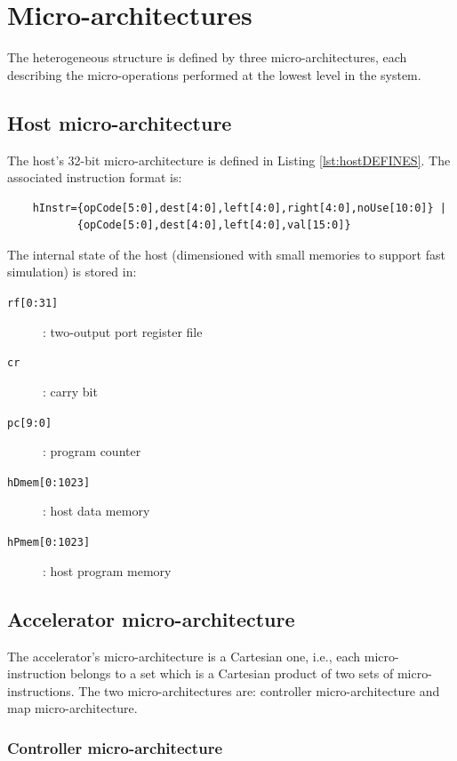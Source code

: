\section{Micro-architectures}

The heterogeneous structure is defined by three micro-architectures, each describing the micro-operations performed at the lowest level in the system.

\subsection{Host micro-architecture}

The host's 32-bit micro-architecture is defined in Listing \ref{lst:hostDEFINES}. The associated instruction format is: 
\begin{verbatim}
    hInstr={opCode[5:0],dest[4:0],left[4:0],right[4:0],noUse[10:0]} | 
           {opCode[5:0],dest[4:0],left[4:0],val[15:0]}
\end{verbatim}
The internal state of the host (dimensioned with small memories to support fast simulation) is stored in:
\begin{description}
    \item[{\tt rf[0:31]}]: two-output port register file
    \item[{\tt cr}]: carry bit
    \item[{\tt pc[9:0]}]: program counter
    \item[{\tt hDmem[0:1023]}]: host data memory
    \item[{\tt hPmem[0:1023]}]: host program memory
\end{description}



\subsection{Accelerator micro-architecture}

The accelerator's micro-architecture is a Cartesian one, i.e., each micro-instruction belongs to a set which is a Cartesian product of two sets of micro-instructions. The two micro-architectures are: controller micro-architecture and map micro-architecture. 

\subsubsection{Controller micro-architecture}

